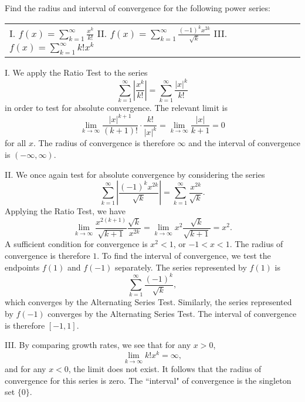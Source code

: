 \documentclass[]{ximera}
\begin{document}
\begin{problem} 
Find the radius and interval of convergence for the following power series:

\begin{tabular}{lll}
I.  $f(x) = \sum_{k=1}^{\infty} \frac{x^k}{k!}$ \qquad  \qquad II. $f(x) = \sum_{k=1}^{\infty} \frac{(-1)^kx^{2k}}{\sqrt{k}}$  \qquad  \qquad III. $f(x) = \sum_{k=1}^{\infty} k! x^k$
\end{tabular}

\begin{freeResponse}
I. We apply the Ratio Test to the series 
$$
\sum_{k=1}^{\infty} \left|\frac{x^k}{k!}\right| = \sum_{k=1}^{\infty} \frac{|x|^k}{k!}
$$
in order to test for absolute convergence. The relevant limit is 
$$
\lim_{k \rightarrow \infty} \frac{|x|^{k+1}}{(k+1)!} \cdot \frac{k!}{|x|^k} = \lim_{k \rightarrow \infty} \frac{|x|}{k+1} = 0
$$
for all $x$. The radius of convergence is therefore $\infty$ and the interval of convergence is $(-\infty,\infty)$.

II. We once again test for absolute convergence by considering the series 
$$
\sum_{k=1}^{\infty} \left|\frac{(-1)^kx^{2k}}{\sqrt{k}}\right| = \sum_{k=1}^{\infty} \frac{x^{2k}}{\sqrt{k}}.
$$
Applying the Ratio Test, we have
$$
\lim_{k\rightarrow \infty} \frac{x^{2(k+1)}}{\sqrt{k+1}} \frac{\sqrt{k}}{x^{2k}} = \lim_{k\rightarrow \infty} x^2 \frac{\sqrt{k}}{\sqrt{k+1}} = x^2.
$$
A sufficient condition for convergence is $x^2 < 1$, or $-1 < x < 1$. The radius of convergence is therefore $1$. To find the interval of convergence, we test the endpoints $f(1)$ and $f(-1)$ separately. The series represented by $f(1)$ is 
$$
\sum_{k=1}^{\infty} \frac{(-1)^k}{\sqrt{k}},
$$
which converges by the Alternating Series Test. Similarly, the series represented by $f(-1)$ converges by the Alternating Series Test. The interval of convergence is therefore $[-1,1]$. 

III. By comparing growth rates, we see that for any $x > 0$, 
$$
\lim_{k\rightarrow \infty} k! x^k  = \infty,
$$
and for any $x < 0$, the limit does not exist. It follows that the radius of convergence for this series is zero. The ``interval" of convergence is the singleton set $\{0\}$. 
\end{freeResponse}
\end{problem}
\end{document}
